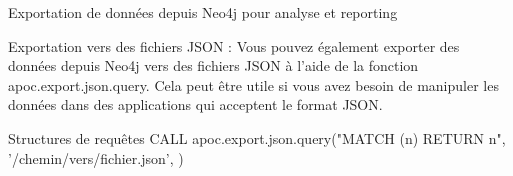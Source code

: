 \begin{frame}{Exportation de données depuis Neo4j pour analyse et reporting}
  \begin{block}{Exportation vers des fichiers JSON :}
 Vous pouvez également exporter des données depuis Neo4j vers des fichiers JSON à l'aide de la fonction apoc.export.json.query. Cela peut être utile si vous avez besoin de manipuler les données dans des applications qui acceptent le format JSON.
  \end{block}
  \begin{block}{Structures de requêtes}
CALL apoc.export.json.query("MATCH (n) RETURN n", '/chemin/vers/fichier.json', {})



  \end{block}
\end{frame}